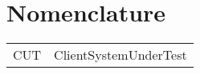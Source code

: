 \section{Nomenclature}
\label{sec:Nomenclature}

\begin{tabular}{ l l }
  CUT & ClientSystemUnderTest \\
\end{tabular}